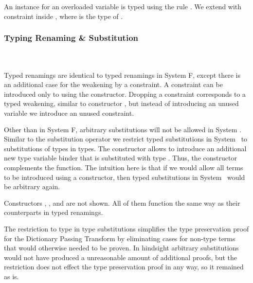 \noindent An instance for an overloaded variable  is typed using the rule . We extend  with constraint  \Constr{:}  inside , where  is the type of . 

\subsubsection{Typing Renaming \& Substitution}\hfill\\\\
Typed renamings are identical to typed renamings in System F, except there is an additional case for the weakening by a constraint. 
\FoRenTyping
A constraint  \Constr{:}  can be introduced only to  using the  constructor. 
Dropping a constraint corresponds to a typed weakening, similar to constructor , but instead of introducing an unused variable we introduce an unused constraint.

\noindent Other than in System F, arbitrary substitutions will not be allowed in System \Fo. 
Similar to the substitution operator we restrict typed substitutions in System \Fo\ to substitutions of types in types. 
\FoSubTyping
\noindent The constructor  allows to introduce an additional new type variable binder that is substituted with type .
Thus, the constructor  complements the  function. 
The intuition here is that if we would allow all terms to be introduced using a  constructor, then typed substitutions in System \Fo\ would be arbitrary again. 

\noindent Constructors  , ,  and  are not shown. All of them function the same way as their counterparts in typed renamings.

\noindent The restriction to type in type substitutions simplifies the type preservation proof for the Dictionary Passing Transform by eliminating cases for non-type terms that would otherwise needed to be proven. In hindsight arbitrary substitutions would not have produced a unreasonable amount of additional proofs, but the restriction does not effect the type preservation proof in any way, so it remained as is.  